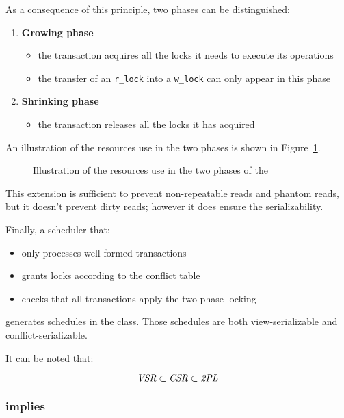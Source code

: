 \documentclass[english]{article}
\begin{document}
As a consequence of this principle, two phases can be distinguished:

\begin{enumerate}
  \item \textbf{Growing phase}
        \begin{itemize}
          \item the transaction acquires all the locks it needs to execute its operations
          \item the transfer of an \texttt{r\_lock} into a \texttt{w\_lock} can only appear in this phase
        \end{itemize}
  \item \textbf{Shrinking phase}
        \begin{itemize}
          \item the transaction releases all the locks it has acquired
        \end{itemize}
\end{enumerate}

An illustration of the resources use in the two phases is shown in Figure~\ref{fig:resources-use-phases-two-phases-locking}.

\begin{figure}[htbp]
  \centering
  \bigskip
  \caption{Illustration of the resources use in the two phases of the \TPL}
  \label{fig:resources-use-phases-two-phases-locking}
  \bigskip
\end{figure}

This extension is sufficient to prevent non-repeatable reads and phantom reads, but it doesn't prevent dirty reads;
however it does ensure the serializability.

\bigskip
Finally, a scheduler that:

\begin{itemize}
  \item only processes well formed transactions
  \item grants locks according to the conflict table
  \item checks that all transactions apply the two-phase locking
\end{itemize}

generates schedules in the \TPL class.
Those schedules are both view-serializable and conflict-serializable.

It can be noted that:

\[ \textit{VSR} \subset \textit{CSR} \subset \textit{2PL} \]

\subsubsection{\TPL implies \CSR}
\end{document}
